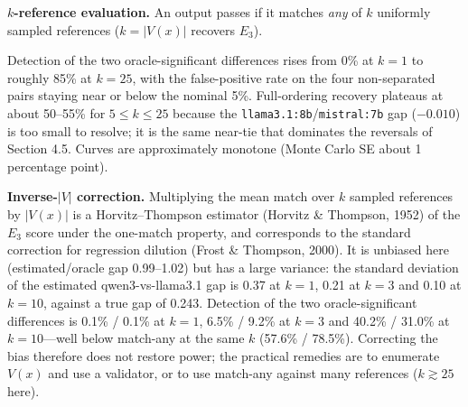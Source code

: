 \documentclass[11pt]{article}
\begin{document}
\textbf{$k$-reference evaluation.} An output passes if it matches \emph{any} of $k$ uniformly sampled references ($k = |V(x)|$ recovers $E_3$).

\begin{table}[htbp]
\centering
\footnotesize
\setlength{\tabcolsep}{3pt}
\caption{Detection and Gap Retention versus Number of References $k$ (Match-Any, 2,000 Draws per $k$)}
\end{table}
Detection of the two oracle-significant differences rises from 0\% at $k=1$ to roughly 85\% at $k=25$, with the false-positive rate on the four non-separated pairs staying near or below the nominal 5\%. Full-ordering recovery plateaus at about 50--55\% for $5 \le k \le 25$ because the \texttt{llama3.1:8b}/\texttt{mistral:7b} gap ($-0.010$) is too small to resolve; it is the same near-tie that dominates the reversals of Section 4.5. Curves are approximately monotone (Monte Carlo SE about 1 percentage point).

\textbf{Inverse-$|V|$ correction.} Multiplying the mean match over $k$ sampled references by $|V(x)|$ is a Horvitz--Thompson estimator (Horvitz \& Thompson, 1952) of the $E_3$ score under the one-match property, and corresponds to the standard correction for regression dilution (Frost \& Thompson, 2000). It is unbiased here (estimated/oracle gap 0.99--1.02) but has a large variance: the standard deviation of the estimated qwen3-vs-llama3.1 gap is 0.37 at $k=1$, 0.21 at $k=3$ and 0.10 at $k=10$, against a true gap of 0.243. Detection of the two oracle-significant differences is 0.1\% / 0.1\% at $k=1$, 6.5\% / 9.2\% at $k=3$ and 40.2\% / 31.0\% at $k=10$---well below match-any at the same $k$ (57.6\% / 78.5\%). Correcting the bias therefore does not restore power; the practical remedies are to enumerate $V(x)$ and use a validator, or to use match-any against many references ($k \gtrsim 25$ here).
\end{document}

